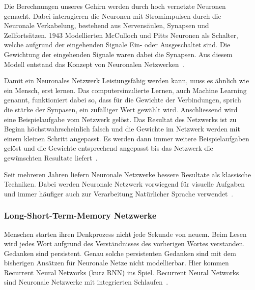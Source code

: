 Die Berechnungen unseres Gehirn werden durch hoch vernetzte Neuronen gemacht. Dabei interagieren die Neuronen mit Stromimpulsen durch die Neuronale Verkabelung, bestehend aus Nervensäulen, Synapsen und Zellfortsätzen. 1943 Modellierten McCulloch und Pitts Neuronen als Schalter, welche aufgrund der eingehenden Signale Ein- oder Ausgeschaltet sind. Die Gewichtung der eingehenden Signale waren dabei die Synapsen. Aus diesem Modell entstand das Konzept von Neuronalen Netzwerken~\autocite{Krogh2008}.

Damit ein Neuronales Netzwerk Leistungsfähig werden kann, muss es ähnlich wie ein Mensch, erst lernen. Das computersimulierte Lernen, auch Machine Learning genannt, funktioniert dabei so, dass für die Gewichte der Verbindungen, sprich die stärke der Synpasen, ein zufälliger Wert gewählt wird. Anschliessend wird eine Beispielaufgabe vom Netzwerk gelöst. Das Resultat des Netzwerks ist zu Beginn höchstwahrscheinlich falsch und die Gewichte im Netzwerk werden mit einem kleinen Schritt angepasst. Es werden dann immer weitere Beispielaufgaben gelöst und die Gewichte entsprechend angepasst bis das Netzwerk die gewünschten Resultate liefert~\autocite{Krogh2008}.

Seit mehreren Jahren liefern Neuronale Netzwerke bessere Resultate als klassische Techniken. Dabei werden Neuronale Netzwerk vorwiegend für visuelle Aufgaben und immer häufiger auch zur Verarbeitung Natürlicher Sprache verwendet~\autocite{Olah2014b}.



\subsubsection{Long-Short-Term-Memory Netzwerke}

Menschen starten ihren Denkprozess nicht jede Sekunde von neuem. Beim Lesen wird jedes Wort aufgrund des Verständnisses des vorherigen Wortes verstanden. Gedanken sind persistent. Genau solche persistenten Gedanken sind mit dem bisherigen Ansätzen für Neuronale Netze nicht modellierbar. Hier kommen Recurrent Neural Networks (kurz RNN) ins Spiel. Recurrent Neural Networks sind Neuronale Netzwerke mit integrierten Schlaufen~\autocite{Olah2015}. 


